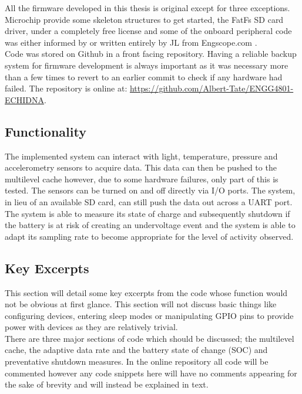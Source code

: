 \documentclass[12pt,openany,a4paper]{book}
\begin{document}
		All the firmware developed in this thesis is original except for three exceptions. Microchip provide some skeleton structures to get started, the FatFs SD card driver, under a completely free license and some of the onboard peripheral code was either informed by or written entirely by JL from Engscope.com \cite{JL2013}. \\
		
		Code was stored on Github in a front facing repository. Having a reliable backup system for firmware development is always important as it was necessary more than a few times to revert to an earlier commit to check if any hardware had failed. The repository is online at: \url{https://github.com/Albert-Tate/ENGG4801-ECHIDNA}.
		
		\subsection{Functionality}

		The implemented system can interact with light, temperature, pressure and accelerometry sensors to acquire data. This data can then be pushed to the multilevel cache however, due to some hardware failures, only part of this is tested. The sensors can be turned on and off directly via I/O ports. The system, in lieu of an available SD card, can still push the data out across a UART port. The system is able to measure its state of charge and subsequently shutdown if the battery is at risk of creating an undervoltage event and the system is able to adapt its sampling rate to become appropriate for the level of activity observed. \\
		
		\subsection{Key Excerpts}
		This section will detail some key excerpts from the code whose function would not be obvious at first glance. This section will not discuss basic things like configuring devices, entering sleep modes or manipulating GPIO pins to provide power with devices as they are relatively trivial. \\
		
		There are three major sections of code which should be discussed; the multilevel cache, the adaptive data rate and the battery state of change (SOC) and preventative shutdown measures. In the online repository all code will be commented however any code snippets here will have no comments appearing for the sake of brevity and will instead be explained in text. \\
\end{document}
